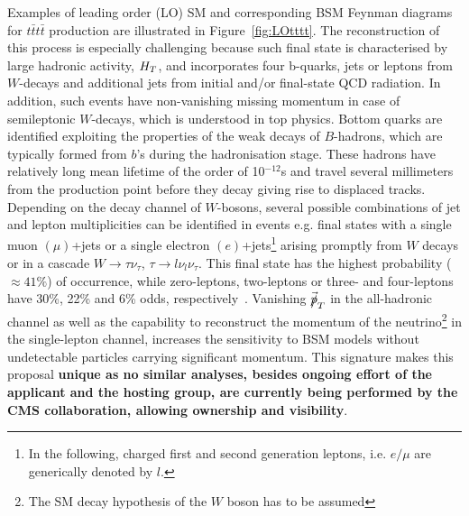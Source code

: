 \textcolor{\mycolor}{
Examples of leading order (LO) SM and corresponding BSM Feynman diagrams for $t\bar{t}t\bar{t}$ production are illustrated in Figure~\ref{fig:LOtttt}. The reconstruction of this process is especially challenging because such final state is characterised by large hadronic activity, $\mbox{$H_T$}$, and incorporates four b-quarks, jets or leptons from $W$-decays and additional jets from initial and/or final-state QCD radiation. In addition, such events have non-vanishing missing momentum in case of semileptonic $W$-decays, which is understood in top physics. Bottom quarks are identified exploiting the properties of the weak decays of $B$-hadrons, which are typically formed from $b$'s during the hadronisation stage. These hadrons have relatively long mean lifetime of the order of 10$^{-12}$s and travel several millimeters from the production point before they decay giving rise to displaced tracks. Depending on the decay channel of $W$-bosons, several possible combinations of jet and lepton multiplicities can be identified in \fourtop events e.g. final states with a single muon $\left(\mu\right)$+jets or a single electron $\left(e\right)$+jets\footnote{In the following, charged first and second generation leptons, i.e. $e/\mu$ are generically denoted by $l$.} arising promptly from $W$ decays or in a cascade $W\rightarrow\tau\nu_\tau$, $\tau\rightarrow l\nu_l \nu_\tau$. This final state has the highest probability ($\approx 41\%$) of occurrence, while zero-leptons, two-leptons or three- and four-leptons have 30\%, 22\% and 6\% odds, respectively~\cite{Khachatryan:2014sca}. Vanishing $\mbox{$\vec{\slashed{p}}_T$}$ in the all-hadronic channel as well as the capability to reconstruct the momentum of the neutrino\footnote{The SM decay hypothesis of the $W$ boson has to be assumed} in the single-lepton channel, increases the sensitivity to BSM models without undetectable particles carrying significant momentum. This signature makes this proposal \textbf{unique as no similar analyses, besides ongoing effort of the applicant and the hosting group, are currently being performed by the CMS collaboration, allowing ownership and visibility}.}

